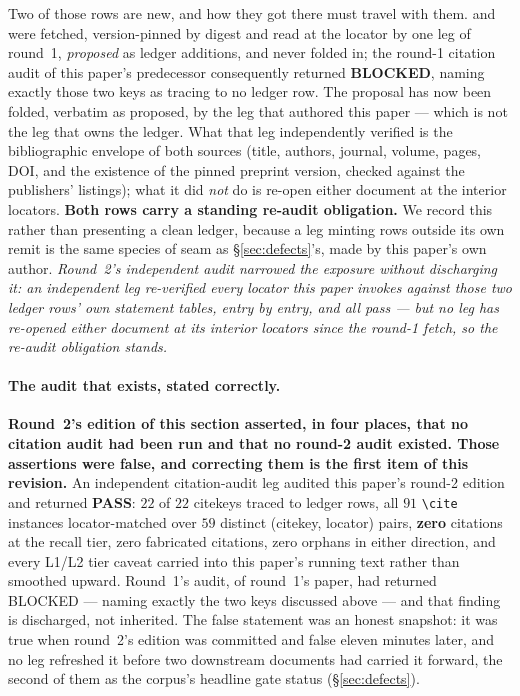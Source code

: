 \documentclass[11pt,a4paper]{article}
\theoremstyle{plain}
\theoremstyle{definition}
\theoremstyle{remark}
\begin{document}
Two of those rows are new, and how they got there must travel with them.
\cite{carneiro2019fourier} and \cite{visser2018andrica} were fetched, version-pinned by digest
and read at the locator by one leg of round~1, \emph{proposed} as ledger additions, and never
folded in; the round-1 citation audit of this paper's predecessor consequently returned
\textbf{BLOCKED}, naming exactly those two keys as tracing to no ledger row. The proposal has
now been folded, verbatim as proposed, by the leg that authored this paper --- which is not the
leg that owns the ledger. What that leg independently verified is the bibliographic envelope of
both sources (title, authors, journal, volume, pages, DOI, and the existence of the pinned
preprint version, checked against the publishers' listings); what it did \emph{not} do is
re-open either document at the interior locators. \textbf{Both rows carry a standing re-audit
obligation.} We record this rather than presenting a clean ledger, because a leg minting rows
outside its own remit is the same species of seam as \S\ref{sec:defects}'s, made by this
paper's own author. \emph{Round~2's independent audit narrowed the exposure without discharging
it: an independent leg re-verified every locator this paper invokes against those two ledger rows'
own statement tables, entry by entry, and all pass --- but no leg has re-opened either document at
its interior locators since the round-1 fetch, so the re-audit obligation stands.}

\paragraph{The audit that exists, stated correctly.} \textbf{Round~2's edition of this section
asserted, in four places, that no citation audit had been run and that no round-2 audit
existed. Those assertions were false, and correcting them is the first item of this
revision.} An independent citation-audit leg audited this paper's round-2 edition and returned
\textbf{PASS}: $22$ of $22$ citekeys traced to ledger rows, all $91$ \verb|\cite| instances
locator-matched over $59$ distinct (citekey, locator) pairs, \textbf{zero} citations at the
recall tier, zero fabricated citations, zero orphans in either direction, and every L1/L2 tier
caveat carried into this paper's running text rather than smoothed upward. Round~1's audit, of
round~1's paper, had returned BLOCKED --- naming exactly the two keys discussed above --- and
that finding is discharged, not inherited. The false statement was an honest snapshot: it was
true when round~2's edition was committed and false eleven minutes later, and no leg refreshed
it before two downstream documents had carried it forward, the second of them as the corpus's
headline gate status (\S\ref{sec:defects}).
\end{document}

